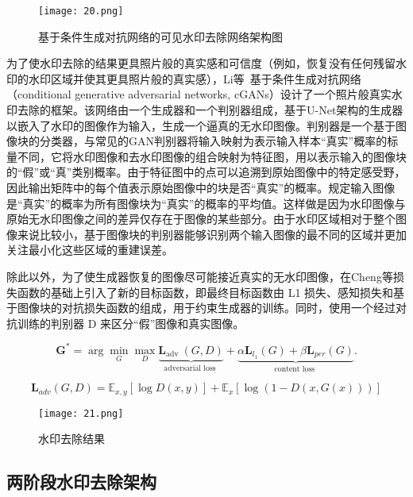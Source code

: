\begin{figure}[!htbp]
	\centering
	\texttt{[image: 20.png]}
	\caption{基于条件生成对抗网络的可见水印去除网络架构图}
	\label{fig:20}
\end{figure}


为了使水印去除的结果更具照片般的真实感和可信度（例如，恢复没有任何残留水印的水印区域并使其更具照片般的真实感），Li等~\cite{li2019towards}基于条件生成对抗网络（conditional generative adversarial networks, cGANs）设计了一个照片般真实水印去除的框架。该网络由一个生成器和一个判别器组成，基于U-Net架构的生成器以嵌入了水印的图像作为输入，生成一个逼真的无水印图像。判别器是一个基于图像块的分类器，与常见的GAN判别器将输入映射为表示输入样本“真实”概率的标量不同，它将水印图像和去水印图像的组合映射为特征图，用以表示输入的图像块的“假”或“真”类别概率。由于特征图中的点可以追溯到原始图像中的特定感受野，因此输出矩阵中的每个值表示原始图像中的块是否“真实”的概率。规定输入图像是“真实”的概率为所有图像块为“真实”的概率的平均值。这样做是因为水印图像与原始无水印图像之间的差异仅存在于图像的某些部分。由于水印区域相对于整个图像来说比较小，基于图像块的判别器能够识别两个输入图像的最不同的区域并更加关注最小化这些区域的重建误差。

除此以外，为了使生成器恢复的图像尽可能接近真实的无水印图像，在Cheng等损失函数的基础上引入了新的目标函数，即最终目标函数由 L1 损失、感知损失和基于图像块的对抗损失函数的组成，用于约束生成器的训练。同时，使用一个经过对抗训练的判别器 D 来区分“假”图像和真实图像。

\begin{equation}
\boldsymbol{G}^*=\arg \min _G \max _D \underbrace{\boldsymbol{L}_{\text {adv }}(G, D)}_{\text {adversarial loss }}+\underbrace{\alpha \boldsymbol{L}_{l_1}(G)+\beta \boldsymbol{L}_{p e r}(G)}_{\text {content loss }} .
\end{equation}

\begin{equation}
\boldsymbol{L}_{a d v}(G, D)=\mathbb{E}_{x, y}[\log D(x, y)]+\mathbb{E}_x[\log (1-D(x, G(x)))]
\end{equation}

\begin{figure}[!htbp]
	\centering
	\texttt{[image: 21.png]}
	\caption{水印去除结果}
	\label{fig:21}
\end{figure}

\subsection{两阶段水印去除架构}

